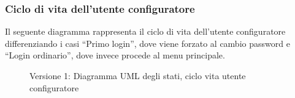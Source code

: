 \subsubsection{Ciclo di vita dell'utente configuratore}
Il seguente diagramma rappresenta il ciclo di vita dell'utente configuratore differenziando i casi ``Primo login'', dove 
viene forzato al cambio password e ``Login ordinario'', dove invece procede al menu principale.
\vspace{0.5cm}
\begin{figure}[H]
    \centering
    \caption{Versione 1: Diagramma UML degli stati, ciclo  vita utente configuratore}
    \label{fig:states_config_user_lifecycle}
\end{figure}